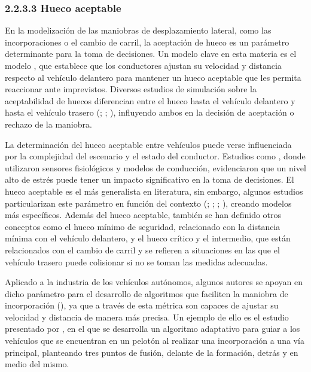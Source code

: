 \subsubsection{2.2.3.3	Hueco aceptable}

En la modelización de las maniobras de desplazamiento lateral, como las incorporaciones o el cambio de carril, la aceptación de hueco es un parámetro determinante para la toma de decisiones. Un modelo clave en esta materia es el modelo  \textcite{gipps}, que establece que los conductores ajustan su velocidad y distancia respecto al vehículo delantero para mantener un hueco aceptable que les permita reaccionar ante imprevistos. Diversos estudios de simulación sobre la aceptabilidad de huecos diferencian entre el hueco hasta el vehículo delantero y hasta el vehículo trasero (\cite{kang}; \cite{sharma20}; \cite{pakzadnia}), influyendo ambos en la decisión de aceptación o rechazo de la maniobra.

La determinación del hueco aceptable entre vehículos puede verse influenciada por la complejidad del escenario y el estado del conductor. Estudios como \textcite{paschalidis}, donde utilizaron sensores fisiológicos y modelos de conducción, evidenciaron que un nivel alto de estrés puede tener un impacto significativo en la toma de decisiones. El hueco aceptable es el más generalista en literatura, sin embargo, algunos estudios particularizan este parámetro en función del contexto (\cite{bonsall}; \cite{sanik}; \cite{virdi}; \cite{yang19}), creando modelos más específicos. Además del hueco aceptable, también se han definido otros conceptos como el hueco mínimo de seguridad, relacionado con la distancia mínima con el vehículo delantero, y el hueco crítico y el intermedio, que están relacionados con el cambio de carril y se refieren a situaciones en las que el vehículo trasero puede colisionar si no se toman las medidas adecuadas.

Aplicado a la industria de los vehículos autónomos, algunos autores se apoyan en dicho parámetro para el desarrollo de algoritmos que faciliten la maniobra de incorporación (\cite{scarinci}), ya que a través de esta métrica son capaces de ajustar su velocidad y distancia de manera más precisa. Un ejemplo de ello es el estudio presentado por \textcite{karbalaieali}, en el que se desarrolla un algoritmo adaptativo para guiar a los vehículos que se encuentran en un pelotón al realizar una incorporación a una vía principal, planteando tres puntos de fusión, delante de la formación, detrás y en medio del mismo.

